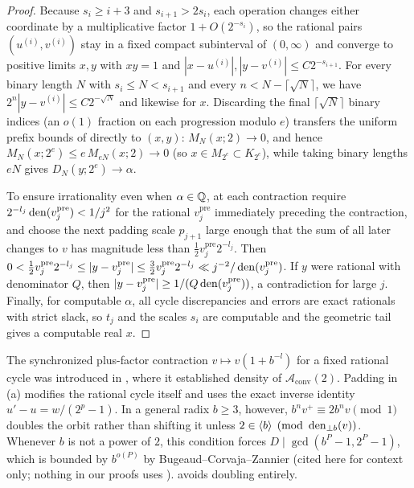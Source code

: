 \documentclass[11pt]{article}
\newcommand{\Aconv}{\mathcal{A}_{\mathrm{conv}}}
\begin{document}
\begin{proof}
Because $s_i\ge i+3$ and $s_{i+1}>2s_i$, each operation changes either coordinate by a multiplicative factor $1+O(2^{-s_i})$, so the rational pairs $(u^{(i)},v^{(i)})$ stay in a fixed compact subinterval of $(0,\infty)$ and converge to positive limits $x,y$ with $xy=1$ and $|x-u^{(i)}|,|y-v^{(i)}|\le C2^{-s_{i+1}}$. For every binary length $N$ with $s_i\le N<s_{i+1}$ and every $n<N-\lceil\sqrt N\rceil$, we have $2^n|y-v^{(i)}|\le C2^{-\sqrt N}$ and likewise for $x$. Discarding the final $\lceil\sqrt N\rceil$ binary indices (an $o(1)$ fraction on each progression modulo $e$) transfers the uniform prefix bounds of  directly to $(x,y)$: $M_N(x;2)\to0$, and hence $M_N(x;2^e)\le e\,M_{eN}(x;2)\to0$ (so $x\in M_{2^e}\subset K_{2^e}$), while taking binary lengths $eN$ gives $D_N(y;2^e)\to\alpha$.

To ensure irrationality even when $\alpha\in\mathbb Q$, at each contraction require $2^{-l_j}\operatorname{den}(v_j^{\mathrm{pre}})<1/j^2$ for the rational $v_j^{\mathrm{pre}}$ immediately preceding the contraction, and choose the next padding scale $p_{j+1}$ large enough that the sum of all later changes to $v$ has magnitude less than $\frac12 v_j^{\mathrm{pre}}2^{-l_j}$. Then $0<\frac12 v_j^{\mathrm{pre}}2^{-l_j}\le |y-v_j^{\mathrm{pre}}|\le \frac32 v_j^{\mathrm{pre}}2^{-l_j}\ll j^{-2}/\operatorname{den}(v_j^{\mathrm{pre}})$. If $y$ were rational with denominator $Q$, then $|y-v_j^{\mathrm{pre}}|\ge 1/(Q\operatorname{den}(v_j^{\mathrm{pre}}))$, a contradiction for large $j$. Finally, for computable $\alpha$, all cycle discrepancies and errors are exact rationals with strict slack, so $t_j$ and the scales $s_i$ are computable and the geometric tail gives a computable real $x$.
\end{proof}

\begin{remark}\label{rem:dyadic-boundary}
The synchronized plus-factor contraction $v\mapsto v(1+b^{-l})$ for a fixed rational cycle was introduced in \cite{PaperXIII}, where it established density of $\Aconv(2)$. Padding in (a) modifies the rational cycle itself and uses the exact inverse identity $u'-u=w/(2^p-1)$. In a general radix $b\ge3$, however, $b^nv^+\equiv 2b^nv\pmod1$ doubles the orbit rather than shifting it unless $2\in\langle b\rangle\pmod{\operatorname{den}_{\perp b}(v)}$. Whenever $b$ is not a power of $2$, this condition forces $D\mid\gcd(b^P-1,2^P-1)$, which is bounded by $b^{o(P)}$ by Bugeaud--Corvaja--Zannier \cite{BCZ03} (cited here for context only; nothing in our proofs uses \cite{BCZ03}).  avoids doubling entirely.
\end{remark}
\end{document}
